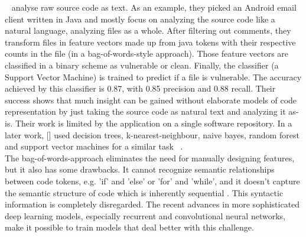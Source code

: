 \documentclass[
	a4paper,
	pagesize,
	pdftex,
	12pt,
	twoside, %
	BCOR=5mm, %
	ngerman,
	fleqn,
	final,
	]{scrartcl}
\begin{document}
~\cite{Hovsepyan.2012} analyse raw source code as text. As an example, they picked an Android email client written in Java and mostly focus on analyzing the source code like a natural language, analyzing files as a whole. After filtering out comments, they transform files in feature vectors made up from java tokens with their respective counts in the file (in a bag-of-words-style approach). Those feature vectors are classified in a binary scheme as vulnerable or clean. Finally, the classifier (a Support Vector Machine) is trained to predict if a file is vulnerable. The accuracy achieved by this classifier is 0.87, with 0.85 precision and 0.88 recall. Their success shows that much insight can be gained without elaborate models of code representation by just taking the source code as natural text and analyzing it as-is. Their work is limited by the application on a single software repository. In a later work, [] used decision trees, k-nearest-neighbour, naive bayes, random forest and support vector machines for a similar task ~\cite{Scandariato.2014}.\\
\label{Bag-of-Words}The bag-of-words-approach eliminates the need for manually designing features, but it also has some drawbacks. It cannot recognize semantic relationships between code tokens, e.g. 'if' and 'else' or 'for' and 'while', and it doesn't capture the semantic structure of code which is inherently sequential \cite{Dam.2017}. This syntactic information is completely disregarded. The recent advances in more sophisticated deep learning models, especially recurrent and convolutional neural networks, make it possible to train models that deal better with this challenge.\\
\end{document}
